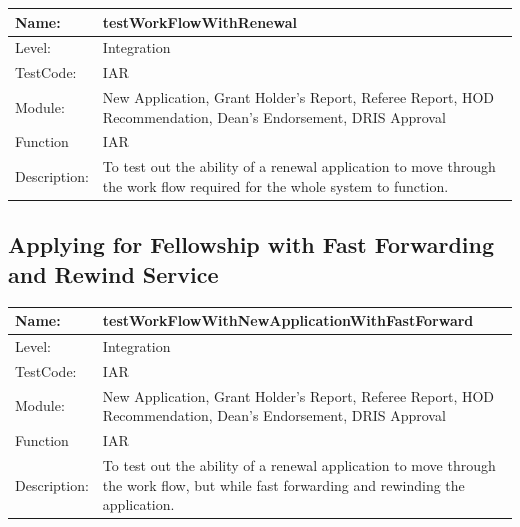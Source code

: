 \documentclass[12pt]{article}
\begin{document}
\begin{center}
\begin{tabular}{|l|p{12cm}|}
\hline
 Name: & testWorkFlowWithRenewal  \\
\hline
Level: & Integration \\
\hline
TestCode: & IAR \\
\hline
Module:&  New Application, Grant Holder's Report, Referee Report, HOD Recommendation, Dean's Endorsement, DRIS Approval\\
\hline
Function & IAR \\
\hline
Description: & To test out the ability of a renewal application to move through the work flow required for the whole system to function. \\
\hline
\end{tabular}
\end{center}


\subsection{Applying for Fellowship with Fast Forwarding and Rewind Service}

\begin{center}
\begin{tabular}{|l|p{12cm}|}
\hline
 Name: & testWorkFlowWithNewApplicationWithFastForward  \\
\hline
Level: & Integration \\
\hline
TestCode: & IAR \\
\hline
Module:&  New Application, Grant Holder's Report, Referee Report, HOD Recommendation, Dean's Endorsement, DRIS Approval\\
\hline
Function & IAR \\
\hline
Description: & To test out the ability of a renewal application to move through the work flow, but while fast forwarding and rewinding the application. \\
\hline
\end{tabular}
\end{center}
\end{document}
